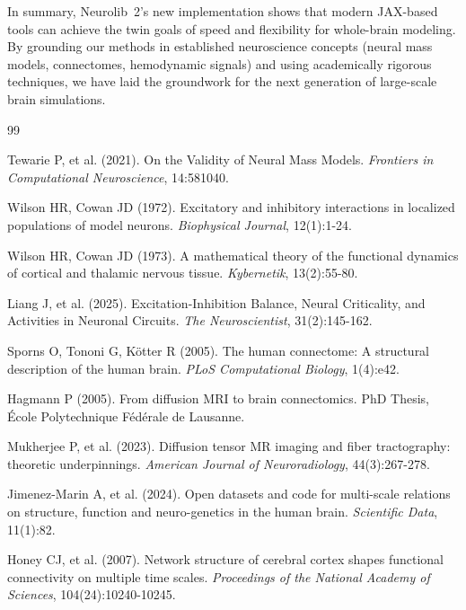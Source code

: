 \documentclass[11pt,a4paper]{article}
\begin{document}
In summary, Neurolib~2’s new implementation shows that modern JAX-based tools can achieve the twin
goals of speed and flexibility for whole-brain modeling. By grounding our methods in established
neuroscience concepts (neural mass models, connectomes, hemodynamic signals) and using academically
rigorous techniques, we have laid the groundwork for the next generation of
large-scale brain simulations.




\begin{thebibliography}{99}


Tewarie P, et al. (2021). On the Validity of Neural Mass Models. \emph{Frontiers in Computational Neuroscience}, 14:581040.

Wilson HR, Cowan JD (1972). Excitatory and inhibitory interactions in localized populations of model neurons. \emph{Biophysical Journal}, 12(1):1-24.

Wilson HR, Cowan JD (1973). A mathematical theory of the functional dynamics of cortical and thalamic nervous tissue. \emph{Kybernetik}, 13(2):55-80.

Liang J, et al. (2025). Excitation-Inhibition Balance, Neural Criticality, and Activities in Neuronal Circuits. \emph{The Neuroscientist}, 31(2):145-162.

Sporns O, Tononi G, Kötter R (2005). The human connectome: A structural description of the human brain. \emph{PLoS Computational Biology}, 1(4):e42.

Hagmann P (2005). From diffusion MRI to brain connectomics. PhD Thesis, École Polytechnique Fédérale de Lausanne.

Mukherjee P, et al. (2023). Diffusion tensor MR imaging and fiber tractography: theoretic underpinnings. \emph{American Journal of Neuroradiology}, 44(3):267-278.

Jimenez-Marin A, et al. (2024). Open datasets and code for multi-scale relations on structure, function and neuro-genetics in the human brain. \emph{Scientific Data}, 11(1):82.

Honey CJ, et al. (2007). Network structure of cerebral cortex shapes functional connectivity on multiple time scales. \emph{Proceedings of the National Academy of Sciences}, 104(24):10240-10245.


\end{thebibliography}
\end{document}
